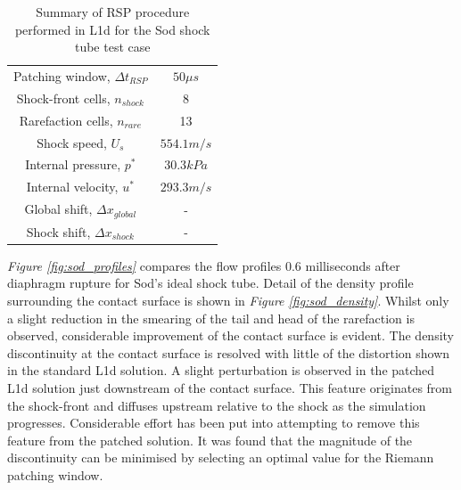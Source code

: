 \documentclass[a4paper,10pt]{article}
\begin{document}
\begin{table}[tbh]
\begin{center}  %
\begin{tabular*}{0.5\textwidth}%
     {@{\extracolsep{\fill}}cc}
\hline Patching window, $\Delta t_{RSP}$ & $50 \mu s$ \\
Shock-front cells, $n_{shock}$ & 8 \\
Rarefaction cells, $n_{rare}$ & 13 \\
Shock speed, $U_{s}$ & $554.1 m/s$ \\
Internal pressure, $p^{*}$ & $30.3 kPa$ \\
Internal velocity, $u^{*}$ & $293.3 m/s$ \\
Global shift, $\Delta x_{global}$ & - \\
Shock shift, $\Delta x_{shock}$ & - \\
\hline
\end{tabular*}
\caption{Summary of RSP procedure performed in L1d for the Sod shock tube test case} \label{table:sod_rsp}
\end{center}
\end{table}

\emph{Figure \ref{fig:sod_profiles}} compares the flow profiles 0.6 milliseconds after diaphragm rupture for Sod's ideal shock tube.  Detail of the density profile surrounding the contact surface is shown in \emph{Figure \ref{fig:sod_density}}.  Whilst only a slight reduction in the smearing of the tail and head of the rarefaction is observed, considerable improvement of the contact surface is evident.  The density discontinuity at the contact surface is resolved with little of the distortion shown in the standard L1d solution.  A slight perturbation is observed in the patched L1d solution just downstream of the contact surface.  This feature originates from the shock-front and diffuses upstream relative to the shock as the simulation progresses.  Considerable effort has been put into attempting to remove this feature from the patched solution.  It was found that the magnitude of the discontinuity can be minimised by selecting an optimal value for the Riemann patching window.
\end{document}
